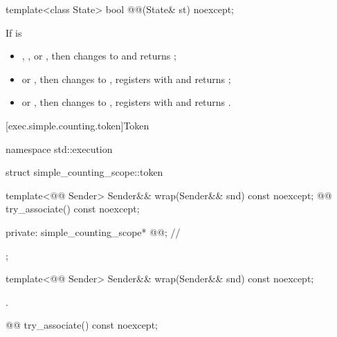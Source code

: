 %
\begin{itemdecl}
template<class State>
  bool @@(State& st) noexcept;
\end{itemdecl}

\begin{itemdescr}
\pnum
\effects
If  is
\begin{itemize}
\item
{}, , or , then
changes  to  and returns ;
\item
{} or , then
changes  to ,
registers  with  and returns ;
\item
{} or , then
changes  to ,
registers  with  and returns .
\end{itemize}
\end{itemdescr}

[exec.simple.counting.token]{Token}

%
\begin{codeblock}
namespace std::execution {
  struct simple_counting_scope::token {
    template<@@ Sender>
      Sender&& wrap(Sender&& snd) const noexcept;
    @@ try_associate() const noexcept;

  private:
    simple_counting_scope* @@;   // \expos
  };
}
\end{codeblock}

%
\begin{itemdecl}
template<@@ Sender>
  Sender&& wrap(Sender&& snd) const noexcept;
\end{itemdecl}

\begin{itemdescr}
\pnum
\returns
{}.
\end{itemdescr}

%
\begin{itemdecl}
@@ try_associate() const noexcept;
\end{itemdecl}

